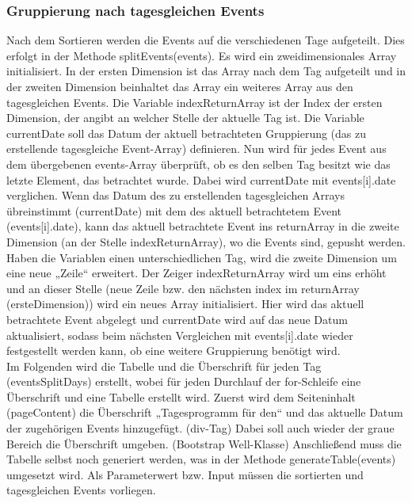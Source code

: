 {\subsubsection{Gruppierung nach tagesgleichen Events}
Nach dem Sortieren werden die Events auf die verschiedenen Tage aufgeteilt. Dies erfolgt in der Methode splitEvents(events). Es wird ein zweidimensionales Array initialisiert. In der ersten Dimension ist das Array nach dem Tag aufgeteilt und in der zweiten Dimension beinhaltet das Array ein weiteres Array aus den tagesgleichen Events. Die Variable indexReturnArray ist der Index der ersten Dimension, der angibt an welcher Stelle der aktuelle Tag ist. Die Variable currentDate soll das Datum der aktuell betrachteten Gruppierung (das zu erstellende tagesgleiche Event-Array) definieren. 
Nun wird für jedes Event aus dem übergebenen events-Array überprüft, ob es den selben Tag besitzt wie das letzte Element, das betrachtet wurde. Dabei wird currentDate mit events[i].date verglichen. 
Wenn das Datum des zu erstellenden tagesgleichen Arrays übreinstimmt (currentDate) mit dem des aktuell betrachtetem Event (events[i].date), kann das aktuell betrachtete Event ins returnArray in die zweite Dimension (an der Stelle indexReturnArray), wo die Events sind, gepusht werden.
Haben die Variablen einen unterschiedlichen Tag, wird die zweite Dimension um eine neue „Zeile“ erweitert. Der Zeiger indexReturnArray wird um eins erhöht und an dieser Stelle (neue Zeile bzw. den nächsten index im returnArray (ersteDimension)) wird ein neues Array initialisiert. Hier wird das aktuell betrachtete Event abgelegt und currentDate wird auf das neue Datum aktualisiert, sodass beim nächsten Vergleichen mit events[i].date wieder festgestellt werden kann, ob eine weitere Gruppierung benötigt wird.\\
Im Folgenden wird die Tabelle und die Überschrift für jeden Tag (eventsSplitDays) erstellt, wobei für jeden Durchlauf der for-Schleife eine Überschrift und eine Tabelle erstellt wird. Zuerst wird dem Seiteninhalt (pageContent) die Überschrift „Tagesprogramm für den“ und das aktuelle Datum der zugehörigen Events hinzugefügt. (div-Tag) Dabei soll auch wieder der graue Bereich die Überschrift umgeben. (Bootstrap Well-Klasse) 
Anschließend muss die Tabelle selbst noch generiert werden, was in der Methode generateTable(events) umgesetzt wird. Als Parameterwert bzw. Input müssen die sortierten und tagesgleichen Events vorliegen. 

}
